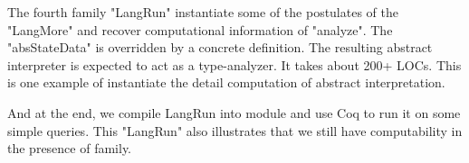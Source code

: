 The fourth family "LangRun" instantiate some of the postulates of the
"LangMore" and recover computational information of "analyze". The "absStateData" is overridden by a concrete definition. The resulting abstract interpreter is expected
to act as a type-analyzer. It takes about 200+ LOCs. This is one example
of instantiate the detail computation of abstract interpretation. 


And at the end, we compile LangRun into module and use Coq to run it on
some simple queries. This "LangRun" also illustrates that we still have
computability in the presence of family.

